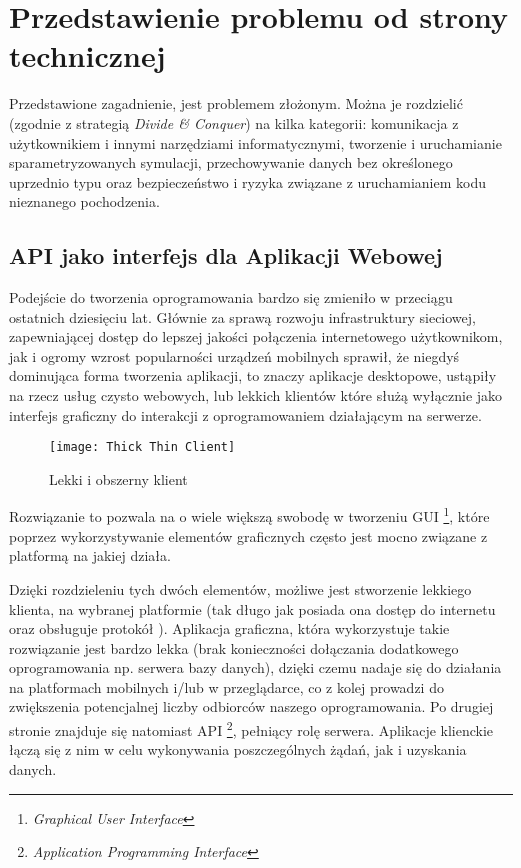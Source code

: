 \chapter{Przedstawienie problemu od strony technicznej}
\label{cha:przedstawienieProblemuOdStronyTechnicznej}

\par Przedstawione zagadnienie, jest problemem złożonym. Można je rozdzielić (zgodnie z strategią \emph{Divide \& Conquer}) na kilka kategorii: komunikacja z użytkownikiem i innymi narzędziami informatycznymi, tworzenie i uruchamianie sparametryzowanych symulacji, przechowywanie danych bez określonego uprzednio typu oraz bezpieczeństwo i ryzyka związane z uruchamianiem kodu nieznanego pochodzenia.

\section{API jako interfejs dla Aplikacji Webowej}

\par Podejście do tworzenia oprogramowania bardzo się zmieniło w przeciągu ostatnich dziesięciu lat. Głównie za sprawą rozwoju infrastruktury sieciowej, zapewniającej dostęp do lepszej jakości połączenia internetowego użytkownikom, jak i ogromy wzrost popularności urządzeń mobilnych sprawił, że niegdyś dominująca forma tworzenia aplikacji, to znaczy aplikacje desktopowe, ustąpiły na rzecz usług czysto webowych, lub lekkich klientów które służą wyłącznie jako interfejs graficzny do interakcji z oprogramowaniem działającym na serwerze.

\begin{figure}[H]
	\begin{center}
		\texttt{[image: Thick Thin Client]}
	\end{center}
	\caption{Lekki i obszerny klient}
\end{figure}

Rozwiązanie to pozwala na o wiele większą swobodę w tworzeniu GUI \footnote{\emph{Graphical User Interface}}, które poprzez wykorzystywanie elementów graficznych często jest mocno związane z platformą na jakiej działa.

\par Dzięki rozdzieleniu tych dwóch elementów, możliwe jest stworzenie lekkiego klienta, na wybranej platformie (tak długo jak posiada ona dostęp do internetu oraz obsługuje protokół \texttt{\https{}}). Aplikacja graficzna, która wykorzystuje takie rozwiązanie jest bardzo lekka (brak konieczności dołączania dodatkowego oprogramowania np. serwera bazy danych), dzięki czemu nadaje się do działania na platformach mobilnych i/lub w przeglądarce, co z kolej prowadzi do zwiększenia potencjalnej liczby odbiorców naszego oprogramowania. Po drugiej stronie znajduje się natomiast API \footnote{\emph{Application Programming Interface}}, pełniący rolę serwera. Aplikacje klienckie łączą się z nim w celu wykonywania poszczególnych żądań, jak i uzyskania danych.

